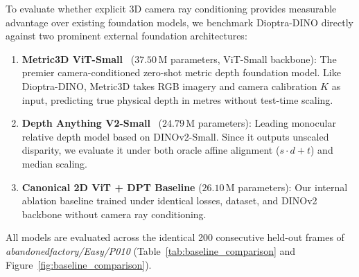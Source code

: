 To evaluate whether explicit 3D camera ray conditioning provides measurable advantage over existing foundation models, we benchmark Dioptra-DINO directly against two prominent external foundation architectures:
\begin{enumerate}
    \item \textbf{Metric3D ViT-Small}~\cite{yin2023metric3d} ($37.50$\,M parameters, ViT-Small backbone): The premier camera-conditioned zero-shot metric depth foundation model. Like Dioptra-DINO, Metric3D takes RGB imagery and camera calibration $K$ as input, predicting true physical depth in metres without test-time scaling.
    \item \textbf{Depth Anything V2-Small}~\cite{yang2024depth2} ($24.79$\,M parameters): Leading monocular relative depth model based on DINOv2-Small. Since it outputs unscaled disparity, we evaluate it under both oracle affine alignment ($s \cdot d + t$) and median scaling.
    \item \textbf{Canonical 2D ViT + DPT Baseline} ($26.10$\,M parameters): Our internal ablation baseline trained under identical losses, dataset, and DINOv2 backbone without camera ray conditioning.
\end{enumerate}
All models are evaluated across the identical 200 consecutive held-out frames of \textit{abandonedfactory/Easy/P010} (Table~\ref{tab:baseline_comparison} and Figure~\ref{fig:baseline_comparison}).

